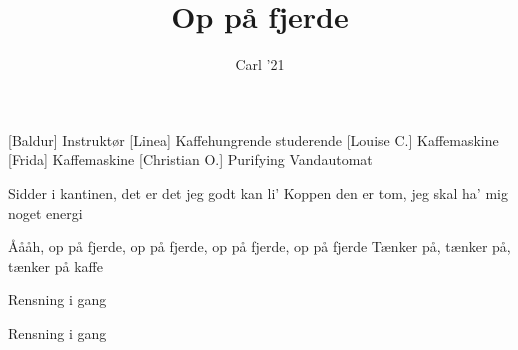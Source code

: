 \documentclass[a4paper,11pt]{article}
\title{Op på fjerde}
\author{Carl '21}
\begin{document}
\maketitle

\begin{roles}
[Baldur] Instruktør
[Linea] Kaffehungrende studerende
[Louise C.] Kaffemaskine
[Frida] Kaffemaskine
[Christian O.] Purifying Vandautomat
\end{roles}

\begin{song}
 Sidder i kantinen, det er det jeg godt kan li'
    Koppen den er tom, jeg skal ha' mig noget energi

    Åååh, op på fjerde, op på fjerde, op på fjerde, op på fjerde
    Tænker på, tænker på, tænker på kaffe



 Rensning i gang


 Rensning i gang

    
\end{song}
\end{document}
